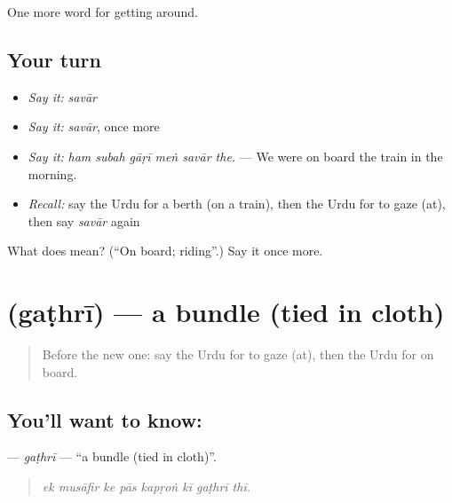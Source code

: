 \begin{grammarlens}[title={What you've built}]
One more word for getting around.
\end{grammarlens}

\subsection*{Your turn}
\begin{itemize}
\raggedright
  \item \emph{Say it:} \emph{savār}
  \item \emph{Say it:} \emph{savār}, once more
  \item \emph{Say it:} \emph{ham subah gāṛī meṅ savār the.} — We were on board the train in the morning.
  \item \emph{Recall:} say the Urdu for a berth (on a train), then the Urdu for to gaze (at), then say \emph{savār} again
\end{itemize}

\begin{tcolorbox}[breakable,colback=teal!4,colframe=teal!35!black,title={Before you move on}]
What does  mean? (\textquotedblleft{}On board; riding\textquotedblright{}.) Say it once more.
\end{tcolorbox}
\section[\texorpdfstring{\ur{گٹھری} (gaṭhrī)}{گٹھری (gaṭhrī)}]{ (gaṭhrī) — a bundle (tied in cloth)}

\label{lesson:UR-C389-gathri}



\begin{quote}
Before the new one: say the Urdu for to gaze (at), then the Urdu for on board.
\end{quote}

\subsection*{You'll want to know: }
\textbf{} — \emph{gaṭhrī} — \textquotedblleft{}a bundle (tied in cloth)\textquotedblright{}.

\begin{quote}
       
\end{quote}

\begin{quote}
\emph{ek musāfir ke pās kapṛoṅ kī gaṭhrī thī.}
\end{quote}


